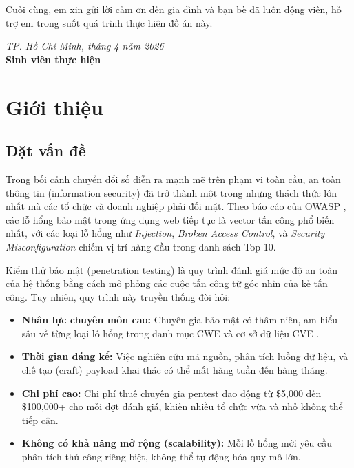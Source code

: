 \documentclass{nt521report}
\begin{document}
Cuối cùng, em xin gửi lời cảm ơn đến gia đình và bạn bè đã luôn động viên, hỗ trợ em trong suốt quá trình thực hiện đồ án này.

\vspace{1cm}
\begin{flushright}
  \textit{TP. Hồ Chí Minh, tháng 4 năm 2026}\\
  \textbf{Sinh viên thực hiện}
\end{flushright}

\tableofcontents
\listoffigures
\listoftables

\chapter{Giới thiệu}
\label{chap:introduction}

\section{Đặt vấn đề}
\label{sec:problem}

Trong bối cảnh chuyển đổi số diễn ra mạnh mẽ trên phạm vi toàn cầu, an toàn thông tin (information security) đã trở thành một trong những thách thức lớn nhất mà các tổ chức và doanh nghiệp phải đối mặt. Theo báo cáo của OWASP \cite{owasp2021top10}, các lỗ hổng bảo mật trong ứng dụng web tiếp tục là vector tấn công phổ biến nhất, với các loại lỗ hổng như \textit{Injection}, \textit{Broken Access Control}, và \textit{Security Misconfiguration} chiếm vị trí hàng đầu trong danh sách Top 10.

Kiểm thử bảo mật (penetration testing) là quy trình đánh giá mức độ an toàn của hệ thống bằng cách mô phỏng các cuộc tấn công từ góc nhìn của kẻ tấn công. Tuy nhiên, quy trình này truyền thống đòi hỏi:

\begin{itemize}
  \item \textbf{Nhân lực chuyên môn cao:} Chuyên gia bảo mật có thâm niên, am hiểu sâu về từng loại lỗ hổng trong danh mục CWE \cite{cwe2024} và cơ sở dữ liệu CVE \cite{cve2024}.
  \item \textbf{Thời gian đáng kể:} Việc nghiên cứu mã nguồn, phân tích luồng dữ liệu, và chế tạo (craft) payload khai thác có thể mất hàng tuần đến hàng tháng.
  \item \textbf{Chi phí cao:} Chi phí thuê chuyên gia pentest dao động từ \$5{,}000 đến \$100{,}000+ cho mỗi đợt đánh giá, khiến nhiều tổ chức vừa và nhỏ không thể tiếp cận.
  \item \textbf{Không có khả năng mở rộng (scalability):} Mỗi lỗ hổng mới yêu cầu phân tích thủ công riêng biệt, không thể tự động hóa quy mô lớn.
\end{itemize}
\end{document}
